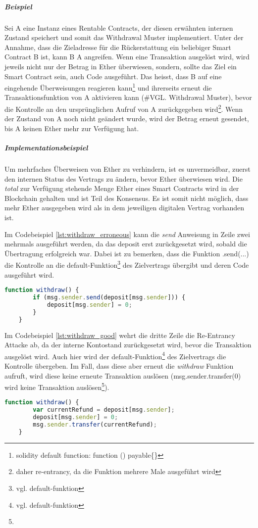 \subparagraph{Beispiel}
Sei A eine Instanz eines Rentable Contracts, der diesen erwähnten internen Zustand speichert und somit das Withdrawal Muster implementiert. Unter der Annahme, dass die Zieladresse für die Rückerstattung ein beliebiger Smart Contract B ist, kann B A angreifen. Wenn eine Transaktion ausgelöst wird, wird jeweils nicht nur der Betrag in Ether überwiesen, sondern, sollte das Ziel ein Smart Contract sein, auch Code ausgeführt. Das heisst, dass B auf eine eingehende Überweisungen reagieren kann\footnote{solidity default function: function () payable\{\}} und ihrerseits erneut die Transaktionsfunktion von A aktivieren kann (\#VGL. Withdrawal Muster), bevor die Kontrolle an den ursprünglichen Aufruf von A zurückgegeben wird\footnote{daher re-entrancy, da die Funktion mehrere Male ausgeführt wird}. Wenn der Zustand von A noch nicht geändert wurde, wird der Betrag erneut gesendet, bis A keinen Ether mehr zur Verfügung hat.

\subparagraph{Implementationsbeispiel}
Um mehrfaches Überweisen von Ether zu verhindern, ist es unvermeidbar, zuerst den internen Status des Vertrags zu ändern, bevor Ether überwiesen wird. Die \emph{total} zur Verfügung stehende Menge Ether eines Smart Contracts wird in der Blockchain gehalten und ist Teil des Konsensus. Es ist somit nicht möglich, dass mehr Ether ausgegeben wird als in dem jeweiligen digitalen Vertrag vorhanden ist. 

Im Codebeispiel \ref{lst:withdraw_erroneous} kann die \emph{send} Anweisung in Zeile zwei mehrmals ausgeführt werden, da das deposit erst zurückgesetzt wird, sobald die Übertragung erfolgreich war. Dabei ist zu bemerken, dass die Funktion .send(...) die Kontrolle an die default-Funktion\footnote{vgl. default-funktion} des Zielvertrags übergibt und deren Code ausgeführt wird.
\begin{lstlisting}[language=javascript,caption={fehlerhaftes Code Snippet},label={lst:withdraw_erroneous}]
    function withdraw() {
        if (msg.sender.send(deposit[msg.sender])) {
            deposit[msg.sender] = 0;
        }
    }
\end{lstlisting}

Im Codebeispiel \ref{lst:withdraw_good} wehrt die dritte Zeile die Re-Entrancy Attacke ab, da der interne Kontostand zurückgesetzt wird, bevor die Transaktion ausgelöst wird. Auch hier wird der default-Funktion\footnote{vgl. default-funktion} des Zielvertrags die Kontrolle übergeben. Im Fall, dass diese aber erneut die \emph{withdraw} Funktion aufruft, wird diese keine erneute Transaktion auslösen (msg.sender.transfer(0) wird keine Transaktion auslösen\footnote{}).
\begin{lstlisting}[language=javascript,caption={empfohlenes Code Snippet},label={lst:withdraw_good}]
    function withdraw() {
        var currentRefund = deposit[msg.sender];
        deposit[msg.sender] = 0;
        msg.sender.transfer(currentRefund);
    }
\end{lstlisting}

